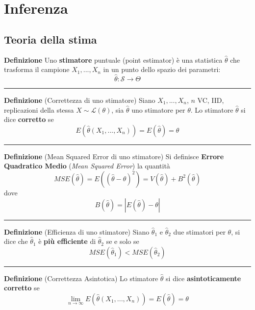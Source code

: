 \documentclass[
  11pt,
]{book}
\theoremstyle{mytheoremstyle}
\theoremstyle{mydefstyle}
\begin{document}
\section{Inferenza}\label{inferenza}

\subsection{Teoria della stima}\label{teoria-della-stima}

\textbf{Definizione}
Uno \textbf{stimatore} puntuale (point estimator) è una statistica \(\hat\theta\) che trasforma il campione \(X_1,...,X_n\) in un punto dello spazio dei parametri:
\[\hat\theta:\mathcal{S}\to\Theta\]

\begin{center}\rule{0.5\linewidth}{0.5pt}\end{center}

\textbf{Definizione} (Correttezza di uno stimatore)
Siano \(X_1,...,X_n\), \(n\) VC, IID, replicazioni della stessa \(X\sim\mathscr{L}(\theta)\), sia \(\hat\theta\) uno stimatore per \(\theta\).
Lo stimatore \(\hat\theta\) si dice \textbf{corretto} se
\[E(\hat\theta(X_1,...,X_n))=E(\hat\theta)=\theta\]

\begin{center}\rule{0.5\linewidth}{0.5pt}\end{center}

\textbf{Definizione} (Mean Squared Error di uno stimatore)
Si definisce \textbf{Errore Quadratico Medio} (\emph{Mean Squared Error}) la quantità
\[MSE(\hat\theta)=E((\hat\theta-\theta)^2)=V(\hat\theta)+B^2(\hat\theta)\]
dove
\[B(\hat\theta)=|E(\hat\theta)-\theta|\]

\begin{center}\rule{0.5\linewidth}{0.5pt}\end{center}

\textbf{Definizione} (Efficienza di uno stimatore)
Siano \(\hat\theta_1\) e \(\hat\theta_2\) due stimatori per \(\theta\), si dice che \(\hat\theta_1\) è \textbf{più efficiente} di \(\hat\theta_2\) se e solo se
\[MSE(\hat\theta_1)<MSE(\hat\theta_2)\]

\begin{center}\rule{0.5\linewidth}{0.5pt}\end{center}

\textbf{Definizione} (Correttezza Asintotica)
Lo stimatore \(\hat\theta\) si dice \textbf{asintoticamente corretto} se
\[\lim_{n\to\infty}E(\hat\theta(X_1,...,X_n))=E(\hat\theta)=\theta\]
\end{document}
